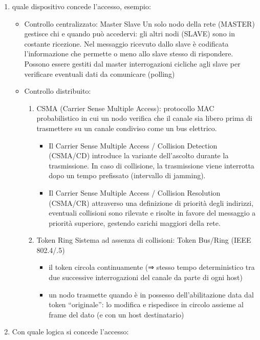 \begin{enumerate}
\def\labelenumi{\arabic{enumi}.}
\item
  quale dispositivo concede l'accesso, esempio:

  \begin{itemize}
  \item
    Controllo centralizzato: Master Slave Un solo nodo della rete
    (MASTER) gestisce chi e quando può accedervi: gli altri nodi (SLAVE)
    sono in costante ricezione. Nel messaggio ricevuto dallo slave è
    codificata l'informazione che permette o meno allo slave stesso di
    rispondere. Possono essere gestiti dal master interrogazioni
    cicliche agli slave per verificare eventuali dati da comunicare
    (polling)
  \item
    Controllo distribuito:

    \begin{enumerate}
    \def\labelenumii{\roman{enumii}.}
    \item
      CSMA (Carrier Sense Multiple Access): protocollo MAC
      probabilistico in cui un nodo verifica che il canale sia libero
      prima di trasmettere su un canale condiviso come un bus elettrico.

      \begin{itemize}
      \item
        Il Carrier Sense Multiple Access / Collision Detection (CSMA/CD)
        introduce la variante dell'ascolto durante la trasmissione. In
        caso di collisione, la trasmissione viene interrotta dopo un
        tempo prefissato (intervallo di jamming).
      \item
        Il Carrier Sense Multiple Access / Collision Resolution
        (CSMA/CR) attraverso una definizione di priorità degli
        indirizzi, eventuali collisioni sono rilevate e risolte in
        favore del messaggio a priorità superiore, gestendo carichi
        maggiori della rete.
      \end{itemize}
    \item
      Token Ring Sistema ad assenza di collisioni: Token Bus/Ring (IEEE
      802.4/.5)

      \begin{itemize}
      \item
        il token circola continuamente (⇒ stesso tempo deterministico
        tra due successive interrogazioni del canale da parte di ogni
        host)
      \item
        un nodo trasmette quando è in possesso dell'abilitazione data
        dal token ``originale'': lo modifica e rispedisce in circolo
        assieme al frame del dato (e con un host destinatario)
      \end{itemize}
    \end{enumerate}
  \end{itemize}
\item
  Con quale logica si concede l'accesso:


\end{enumerate}
